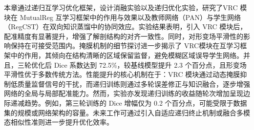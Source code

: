 本章通过递归互学习优化框架，设计消融实验以及递归优化实验，研究了VRC 模块在 MutualReg 互学习框架中的作用与效果以及教师网络（PAN）与学生网络（RegCST）在双向知识蒸馏中的协同效应。实验结果表明，引入 VRC 模块后，配准精度有显著提升，增强了解剖结构的对齐一致性。同时，对形变场平滑性的影响保持在可接受范围内。掩膜机制的细节探讨进一步揭示了 VRC模块在互学习框架中的作用，其倾向在结构清晰的区域保留监督，避免模糊区域误导学生网络。并且，三轮优化后 Dice 系数达到 72.5\%，较基线模型提升 2.3 个百分点，且形变场平滑性优于多数传统方法。性能提升的核心机制在于：VRC 模块通过动态掩膜抑制低质量监督信号的干扰，而递归训练则通过多轮误差修正与知识融合，逐步增强网络的全局与局部配准能力。然而，实验亦发现递归训练的收益随轮次增加呈现边际递减趋势。例如，第三轮训练的 Dice 增幅仅为 0.2 个百分点，可能受限于数据集的规模或网络架构的容量。未来工作可通过引入自适应递归终止机制或融合多模态相似性准则进一步提升优化效率。